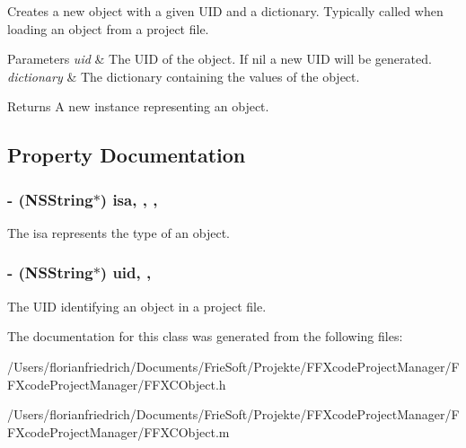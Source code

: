 Creates a new object with a given U\-I\-D and a dictionary. Typically called when loading an object from a project file. 
\begin{DoxyParams}{Parameters}
{\em uid} & The U\-I\-D of the object. If nil a new U\-I\-D will be generated. \\
\hline
{\em dictionary} & The dictionary containing the values of the object. \\
\hline
\end{DoxyParams}
\begin{DoxyReturn}{Returns}
A new instance representing an object. 
\end{DoxyReturn}


\subsection{Property Documentation}
\hypertarget{interface_f_f_x_c_object_a8f7fdbf7bce028a3db9e0b578c062394}{
\subsubsection[{isa}]{\setlength{\rightskip}{0pt plus 5cm}-\/ (N\-S\-String$\ast$) isa\hspace{0.3cm}{\ttfamily [read]}, {\ttfamily [write]}, {\ttfamily [nonatomic]}, {\ttfamily [strong]}}}\label{interface_f_f_x_c_object_a8f7fdbf7bce028a3db9e0b578c062394}
The isa represents the type of an object. \hypertarget{interface_f_f_x_c_object_a7c21028f6fd9d0c869415010be114a11}{
\subsubsection[{uid}]{\setlength{\rightskip}{0pt plus 5cm}-\/ (N\-S\-String$\ast$) uid\hspace{0.3cm}{\ttfamily [read]}, {\ttfamily [nonatomic]}, {\ttfamily [strong]}}}\label{interface_f_f_x_c_object_a7c21028f6fd9d0c869415010be114a11}
The U\-I\-D identifying an object in a project file. 

The documentation for this class was generated from the following files\-:\begin{DoxyCompactItemize}
\item 
/\-Users/florianfriedrich/\-Documents/\-Frie\-Soft/\-Projekte/\-F\-F\-Xcode\-Project\-Manager/\-F\-F\-Xcode\-Project\-Manager/F\-F\-X\-C\-Object.\-h\item 
/\-Users/florianfriedrich/\-Documents/\-Frie\-Soft/\-Projekte/\-F\-F\-Xcode\-Project\-Manager/\-F\-F\-Xcode\-Project\-Manager/F\-F\-X\-C\-Object.\-m\end{DoxyCompactItemize}
